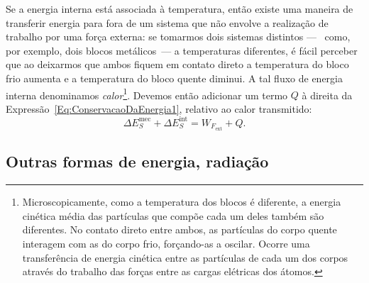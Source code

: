 Se a energia interna está associada à temperatura, então existe uma maneira de transferir energia para fora de um sistema que não envolve a realização de trabalho por uma força externa: se tomarmos dois sistemas distintos ---~ como, por exemplo, dois blocos metálicos~--- a temperaturas diferentes, é fácil perceber que ao deixarmos que ambos fiquem em contato direto a temperatura do bloco frio aumenta e a temperatura do bloco quente diminui. A tal fluxo de energia interna denominamos \emph{calor}\footnote{Microscopicamente, como a temperatura dos blocos é diferente, a energia cinética média das partículas que compõe cada um deles também são diferentes. No contato direto entre ambos, as partículas do corpo quente interagem com as do corpo frio, forçando-as a oscilar. Ocorre uma transferência de energia cinética entre as partículas de cada um dos corpos através do trabalho das forças entre as cargas elétricas dos átomos.}. Devemos então adicionar um termo $Q$ à direita da Expressão~\eqref{Eq:ConservacaoDaEnergia1}, relativo ao calor transmitido:
    \begin{equation}\label{Eq:ConservacaoDaEnergia1Q}
    \Delta E_S^{\text{mec}} + \Delta E_S^{\text{int}} = W_{F_{\text{ext}}} + Q.
\end{equation}


\subsection{Outras formas de energia, radiação}

